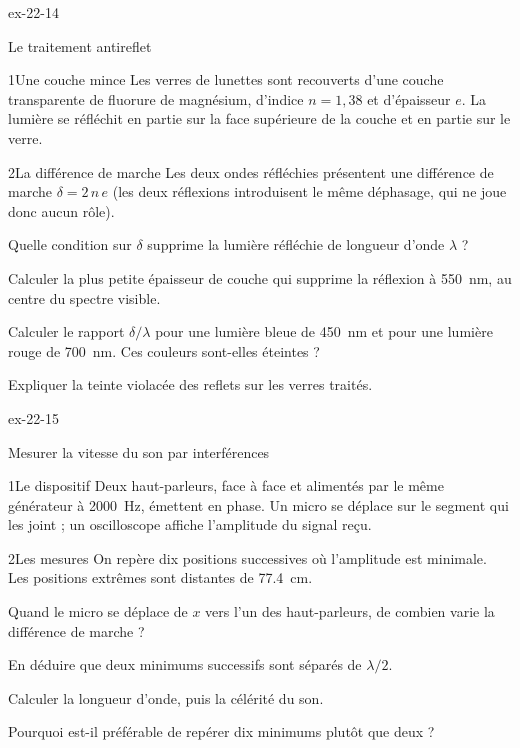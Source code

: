 \begin{blocLivre}{ex-22-14}
\begin{exercice}[3]{Le traitement antireflet}
\begin{docu}{1}{Une couche mince}
Les verres de lunettes sont recouverts d'une couche transparente de fluorure de magnésium, d'indice $n=1{,}38$ et
d'épaisseur $e$. La lumière se réfléchit en partie sur la face supérieure de la couche et en partie sur le verre.
\end{docu}
\begin{docu}{2}{La différence de marche}
Les deux ondes réfléchies présentent une différence de marche $\delta=2\,n\,e$ (les deux réflexions introduisent le même
déphasage, qui ne joue donc aucun rôle).
\end{docu}
\begin{questions}
\item Quelle condition sur $\delta$ supprime la lumière réfléchie de longueur d'onde $\lambda$ ?
\item \initiative Calculer la plus petite épaisseur de couche qui supprime la réflexion à \qty{550}{nm}, au centre du spectre
visible.
\item Calculer le rapport $\delta/\lambda$ pour une lumière bleue de \qty{450}{nm} et pour une lumière rouge de \qty{700}{nm}.
Ces couleurs sont-elles éteintes ?
\item Expliquer la teinte violacée des reflets sur les verres traités.
\end{questions}
\end{exercice}
\end{blocLivre}
\begin{blocLivre}{ex-22-15}
\begin{exercice}[3]{Mesurer la vitesse du son par interférences}
\begin{docu}{1}{Le dispositif}
Deux haut-parleurs, face à face et alimentés par le même générateur à \qty{2000}{Hz}, émettent en phase. Un micro se déplace
sur le segment qui les joint ; un oscilloscope affiche l'amplitude du signal reçu.
\end{docu}
\begin{docu}{2}{Les mesures}
On repère dix positions successives où l'amplitude est minimale. Les positions extrêmes sont distantes de
\qty{77,4}{cm}.
\end{docu}
\begin{questions}
\item Quand le micro se déplace de $x$ vers l'un des haut-parleurs, de combien varie la différence de marche ?
\item En déduire que deux minimums successifs sont séparés de $\lambda/2$.
\item \initiative Calculer la longueur d'onde, puis la célérité du son.
\item Pourquoi est-il préférable de repérer dix minimums plutôt que deux ?
\end{questions}
\end{exercice}
\end{blocLivre}
